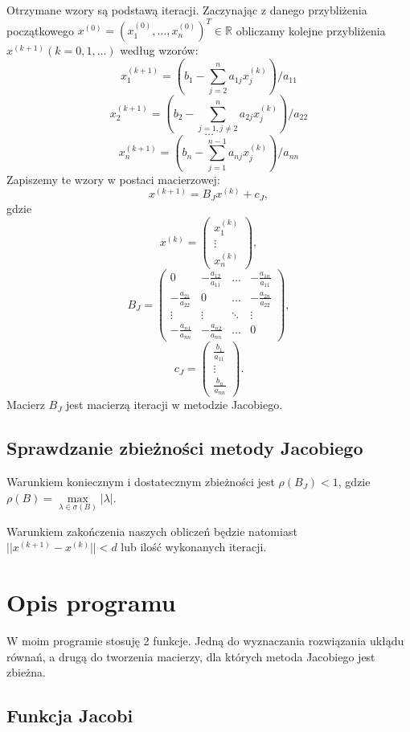 \documentclass{article}
\begin{document}
Otrzymane wzory są podstawą iteracji. Zaczynając z danego przybliżenia początkowego \(x^{(0)}=(x_1^{(0)},\dots,x_n^{(0)})^T \in \mathbb{R} \) obliczamy kolejne przybliżenia \(x^{(k+1)}(k=0,1,\dots)\) według wzorów:
\[x_1^{(k+1)}=(b_1-\sum_{j=2}^{n}a_{1j}x_j^{(k)})/a_{11}\]
\[x_2^{(k+1)}=(b_2-\sum_{j=1, j\not=2}^{n}a_{2j}x_j^{(k)})/a_{22}\]
\[\dots\]
\[x_n^{(k+1)}=(b_n-\sum_{j=1}^{n-1}a_{nj}x_j^{(k)})/a_{nn}\]
Zapiszemy te wzory w postaci macierzowej:
\[x^{(k+1)}=B_Jx^{(k)}+c_J,\]
gdzie
\[x^{(k)}=\begin{pmatrix}
x_1^{(k)}\\
\vdots\\
x_n^{(k)}
\end{pmatrix},\]
\[B_J=\begin{pmatrix}
0 & -\frac{a_{12}}{a_{11}} & \dots & -\frac{a_{1n}}{a_{11}}\\
-\frac{a_{21}}{a_{22}} & 0 & \dots & -\frac{a_{2n}}{a_{22}}\\
\vdots & \vdots & \ddots & \vdots\\
-\frac{a_{n1}}{a_{nn}} & -\frac{a_{n2}}{a_{nn}} & \dots & 0
\end{pmatrix},\]
\[c_J=\begin{pmatrix}
\frac{b_1}{a_{11}}\\
\vdots\\
\frac{b_n}{a_{nn}}
\end{pmatrix}.\]
Macierz \(B_J\) jest macierzą iteracji w metodzie Jacobiego.

\subsection{Sprawdzanie zbieżności metody Jacobiego}

Warunkiem koniecznym i dostatecznym zbieżności jest \(\rho(B_J)<1\), gdzie \(\rho(B)=\max\limits_{\lambda \in \sigma(B)} |\lambda|\).

Warunkiem zakończenia naszych obliczeń będzie natomiast \(||x^{(k+1)}-x^{(k)}||<d\) lub ilość wykonanych iteracji.

\section{Opis programu}

W moim programie stosuję 2 funkcje. Jedną do wyznaczania rozwiązania ukłądu równań, a drugą do tworzenia macierzy, dla których metoda Jacobiego jest zbieżna.

\subsection{Funkcja Jacobi}
\end{document}

